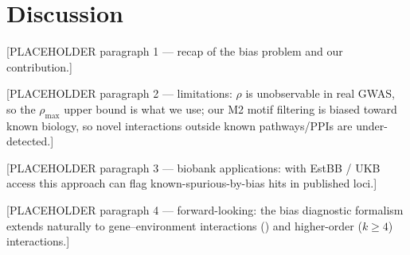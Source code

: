 
\section{Discussion}\label{sec:discussion}

[PLACEHOLDER paragraph 1 --- recap of the bias problem and our
contribution.]

[PLACEHOLDER paragraph 2 --- limitations: $\rho$ is unobservable
in real GWAS, so the $\rho_{\max}$ upper bound is what we use;
our M2 motif filtering is biased toward known biology, so novel
interactions outside known pathways/PPIs are under-detected.]

[PLACEHOLDER paragraph 3 --- biobank applications: with EstBB / UKB
access this approach can flag known-spurious-by-bias hits in published
loci.]

[PLACEHOLDER paragraph 4 --- forward-looking: the bias diagnostic
formalism extends naturally to gene--environment interactions
(\cite{herrera2024gxe}) and higher-order ($k\geq 4$) interactions.]

